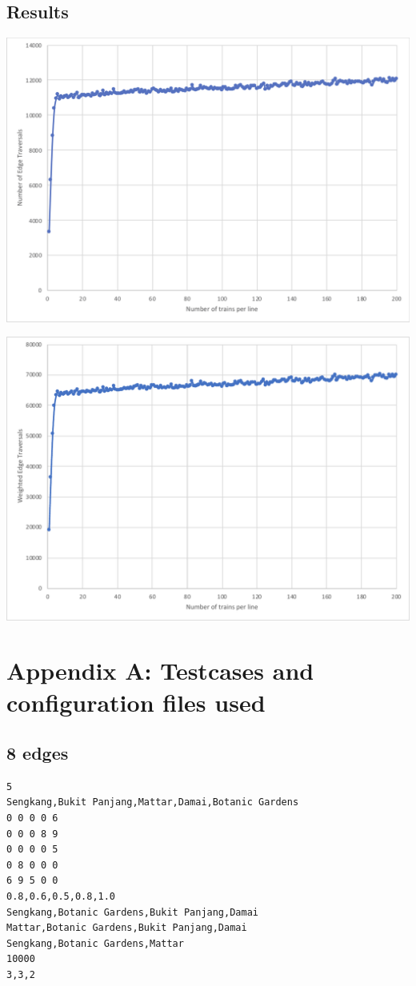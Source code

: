 \documentclass[a4paper,12pt]{article}
\begin{document}
\subsection{Results}
\begin{center}
  \includegraphics[width=0.65\linewidth]{edge-chart}
\end{center}
\begin{center}
  \includegraphics[width=0.65\linewidth]{weighted-edge-chart}
\end{center}

\newpage

\section*{Appendix A: Testcases and configuration files used}
\subsection*{8 edges}
\begin{verbatim}
5
Sengkang,Bukit Panjang,Mattar,Damai,Botanic Gardens
0 0 0 0 6
0 0 0 8 9
0 0 0 0 5
0 8 0 0 0
6 9 5 0 0
0.8,0.6,0.5,0.8,1.0
Sengkang,Botanic Gardens,Bukit Panjang,Damai
Mattar,Botanic Gardens,Bukit Panjang,Damai
Sengkang,Botanic Gardens,Mattar
10000
3,3,2
\end{verbatim}
\end{document}
